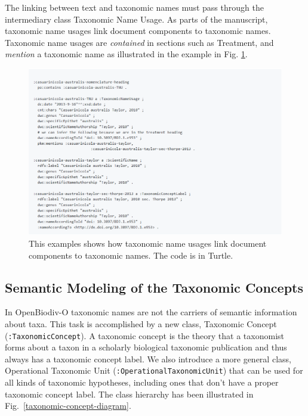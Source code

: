 The linking between text and taxonomic names must pass through the intermediary class Taxonomic Name Usage. As parts of the manuscript, taxonomic name usages link document components to taxonomic names. Taxonomic name usages are \emph{contained} in sections such as Treatment, and \emph{mention} a taxonomic name as illustrated in the example in Fig. \ref{example-taxonomic-name-usage}.

\begin{figure}[h!]
\centering
  \includegraphics[width=\textwidth]{Figures/example-taxonomic-name-usage}
  \decoRule
  \caption[Example taxonomic name usage.]{
  This examples shows how taxonomic name usages link document components to taxonomic names. The code is in Turtle.}
  \label{example-taxonomic-name-usage}
\end{figure}

\subsection{Semantic Modeling of the Taxonomic Concepts}

In OpenBiodiv-O taxonomic names are not the carriers of semantic information about taxa. This task is accomplished by a new class, Taxonomic Concept ({\tt :TaxonomicConcept}). A taxonomic concept is the theory that a taxonomist forms about a taxon in a scholarly biological taxonomic publication and thus always has a taxonomic concept label. We also introduce a more general class, Operational Taxonomic Unit ({\tt :OperationalTaxonomicUnit}) that can be used for all kinds of taxonomic hypotheses, including ones that don't have a proper taxonomic concept label. The class hierarchy has been illustrated in Fig.~\ref{taxonomic-concept-diagram}.


